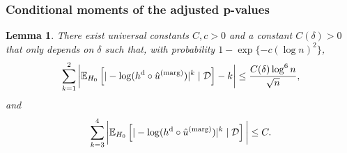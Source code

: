 \documentclass[11pt]{article}
\newtheorem{lemma}{Lemma}
\def\E{\mathbb{E}}
\def\marg{\textnormal{(marg)}}
\def\dkwm{\textnormal{d}}
\newcommand{\D}{\mathcal{D}}
\begin{document}
\subsubsection{Conditional moments of the adjusted p-values}
\begin{lemma}\label{lem:cond_moments_dkwm}
  There exist universal constants $C, c > 0$ and a constant $C(\delta) > 0$ that only depends on $\delta$ such that, with probability $1 - \exp\{-c(\log n)^2\}$,
  \begin{equation*}
    \sum_{k=1}^{2}\bigg|\E_{H_0}\left[|-\log (h^\dkwm \circ \hat{u}^\marg)|^k\mid \D\right] - k\bigg| \le \frac{C(\delta)\log^6 n}{\sqrt{n}},
  \end{equation*}
  and
  \begin{equation*}
    \sum_{k=3}^{4}\bigg|\E_{H_0}\left[|-\log (h^\dkwm \circ \hat{u}^\marg)|^k\mid \D\right]\bigg|\le C.
  \end{equation*}
\end{lemma}
\end{document}
